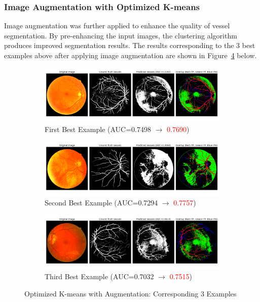 \documentclass[12pt,letterpaper]{article}
\begin{document}
\subsubsection{Image Augmentation with Optimized K-means}
Image augmentation was further applied to enhance the quality of vessel segmentation. By pre-enhancing the input images, the clustering algorithm produces improved segmentation results. The results corresponding to the 3 best examples above after applying image augmentation are shown in Figure~\ref{fig:opt_aug} below. 
\begin{figure}[H]
    \centering
    \begin{subfigure}[H]{\textwidth}
        \centering
        \includegraphics[scale=0.35]{Figures/4 Optimized 1st.png}
        \vspace{-0.5cm}
        \caption{First Best Example (AUC=0.7498 $\rightarrow$ \textcolor{red}{0.7690})}
        \label{fig:opt_aug1}
    \end{subfigure}
    \begin{subfigure}[H]{\textwidth}
        \centering
        \includegraphics[scale=0.35]{Figures/4 Optimized 2nd.png}
        \vspace{-0.5cm}
        \caption{Second Best Example (AUC=0.7294 $\rightarrow$ \textcolor{red}{0.7757})}
        \label{fig:opt_aug2}
    \end{subfigure}
    \begin{subfigure}[H]{\textwidth}
        \centering
        \includegraphics[scale=0.35]{Figures/4 Optimized 3rd.png}
        \vspace{-0.5cm}
        \caption{Third Best Example (AUC=0.7032 $\rightarrow$ \textcolor{red}{0.7515})}
        \label{fig:opt_aug3}
    \end{subfigure}
    \caption{Optimized K-means with Augmentation: Corresponding 3 Examples}
    \label{fig:opt_aug}
\end{figure}
\end{document}
